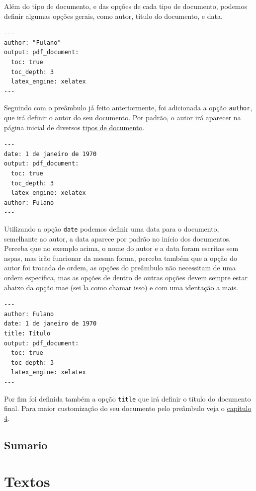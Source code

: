 \documentclass[
]{book}
\begin{document}
Além do tipo de documento, e das opções de cada tipo de documento, podemos definir algumas opções gerais, como autor, título do documento, e data.

\begin{verbatim}
---
author: "Fulano"
output: pdf_document:
  toc: true
  toc_depth: 3
  latex_engine: xelatex
---
\end{verbatim}

Seguindo com o preâmbulo já feito anteriormente, foi adicionada a opção \texttt{author}, que irá definir o autor do seu documento. Por padrão, o autor irá aparecer na página inicial de diversos \protect\hyperlink{possuxedveis-tipos-de-outputs}{tipos de documento}.

\begin{verbatim}
---
date: 1 de janeiro de 1970
output: pdf_document:
  toc: true
  toc_depth: 3
  latex_engine: xelatex
author: Fulano
---
\end{verbatim}

Utilizando a opção \texttt{date} podemos definir uma data para o documento, semelhante ao autor, a data aparece por padrão no início dos documentos.
Perceba que no exemplo acima, o nome do autor e a data foram escritas sem aspas, mas irão funcionar da mesma forma, perceba também que a opção do autor foi trocada de ordem, as opções do preâmbulo não necessitam de uma ordem específica, mas as opções de dentro de outras opções devem sempre estar abaixo da opção mae (sei la como chamar isso) e com uma identação a mais.

\begin{verbatim}
---
author: Fulano
date: 1 de janeiro de 1970
title: Título
output: pdf_document:
  toc: true
  toc_depth: 3
  latex_engine: xelatex
---
\end{verbatim}

Por fim foi definida também a opção \texttt{title} que irá definir o título do documento final. Para maior customização do seu documento pelo preâmbulo veja o \protect\hyperlink{depois-crio}{capítulo 4}.

\hypertarget{sumario}{%
\subsection{Sumario}\label{sumario}}

\hypertarget{textos}{%
\section{Textos}\label{textos}}
\end{document}
